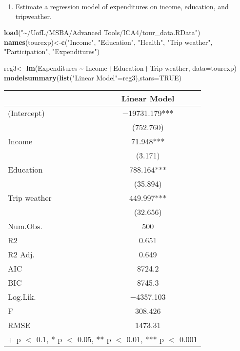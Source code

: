 \documentclass[
]{article}
\newenvironment{Shaded}{\begin{snugshade}}{\end{snugshade}}
\newcommand{\AttributeTok}[1]{\textcolor[rgb]{0.13,0.29,0.53}{#1}}
\newcommand{\ConstantTok}[1]{\textcolor[rgb]{0.56,0.35,0.01}{#1}}
\newcommand{\FunctionTok}[1]{\textcolor[rgb]{0.13,0.29,0.53}{\textbf{#1}}}
\newcommand{\NormalTok}[1]{#1}
\newcommand{\OtherTok}[1]{\textcolor[rgb]{0.56,0.35,0.01}{#1}}
\newcommand{\SpecialCharTok}[1]{\textcolor[rgb]{0.81,0.36,0.00}{\textbf{#1}}}
\newcommand{\StringTok}[1]{\textcolor[rgb]{0.31,0.60,0.02}{#1}}
\providecommand{\tightlist}{%
  \setlength{\itemsep}{0pt}\setlength{\parskip}{0pt}}
\begin{document}
\begin{enumerate}
\def\labelenumi{\alph{enumi})}
\tightlist
\item
  Estimate a regression model of expenditures on income, education, and
  tripweather.
\end{enumerate}

\begin{Shaded}
\begin{Highlighting}[]
\FunctionTok{load}\NormalTok{(}\StringTok{"\textasciitilde{}/UofL/MSBA/Advanced Tools/ICA4/tour\_data.RData"}\NormalTok{)}
\FunctionTok{names}\NormalTok{(tourexp)}\OtherTok{\textless{}{-}}\FunctionTok{c}\NormalTok{(}\StringTok{"Income"}\NormalTok{, }\StringTok{"Education"}\NormalTok{, }\StringTok{"Health"}\NormalTok{, }\StringTok{"Trip weather"}\NormalTok{, }\StringTok{"Participation"}\NormalTok{, }\StringTok{"Expenditures"}\NormalTok{)}

\NormalTok{reg3}\OtherTok{\textless{}{-}} \FunctionTok{lm}\NormalTok{(Expenditures }\SpecialCharTok{\textasciitilde{}}\NormalTok{ Income}\SpecialCharTok{+}\NormalTok{Education}\SpecialCharTok{+}\StringTok{\textasciigrave{}}\AttributeTok{Trip weather}\StringTok{\textasciigrave{}}\NormalTok{, }\AttributeTok{data=}\NormalTok{tourexp)}
\FunctionTok{modelsummary}\NormalTok{(}\FunctionTok{list}\NormalTok{(}\StringTok{"Linear Model"}\OtherTok{=}\NormalTok{reg3),}\AttributeTok{stars=}\ConstantTok{TRUE}\NormalTok{)}
\end{Highlighting}
\end{Shaded}

\begin{table}
\centering
\begin{tabular}[t]{lc}
\toprule
  & Linear Model\\
\midrule
(Intercept) & \num{-19731.179}***\\
 & (\num{752.760})\\
Income & \num{71.948}***\\
 & (\num{3.171})\\
Education & \num{788.164}***\\
 & (\num{35.894})\\
Trip weather & \num{449.997}***\\
 & (\num{32.656})\\
\midrule
Num.Obs. & \num{500}\\
R2 & \num{0.651}\\
R2 Adj. & \num{0.649}\\
AIC & \num{8724.2}\\
BIC & \num{8745.3}\\
Log.Lik. & \num{-4357.103}\\
F & \num{308.426}\\
RMSE & \num{1473.31}\\
\bottomrule
\multicolumn{2}{l}{\rule{0pt}{1em}+ p $<$ 0.1, * p $<$ 0.05, ** p $<$ 0.01, *** p $<$ 0.001}\\
\end{tabular}
\end{table}
\end{document}
